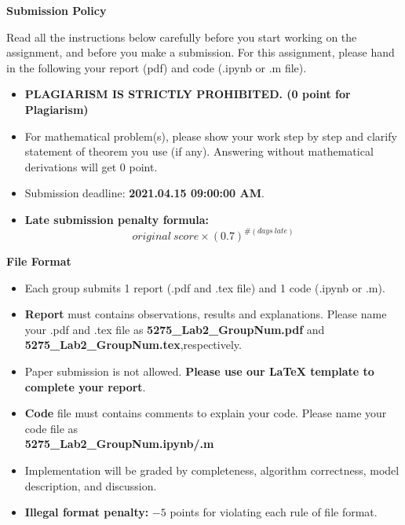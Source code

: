 \documentclass[a4 paper]{article}
\begin{document}
\noindent{\color{LightRubineRed} \rule{\linewidth}{1mm} }
\begin{center}
    \textbf{\Large{Submission Policy}}
\end{center}
\noindent{\color{LightRubineRed} \rule{\linewidth}{1mm} }
\par Read all the instructions below carefully before you start working on the assignment, and before you make a submission. For this assignment, please hand in the following your report (pdf) and code (.ipynb or .m file).
\begin{itemize}
    \item \textbf{PLAGIARISM IS STRICTLY PROHIBITED. (0 point for Plagiarism)}
    \item For mathematical problem(s), please show your work step by step and clarify statement of theorem you use (if any). Answering without mathematical derivations will get 0 point.
    \item Submission deadline: \textbf{2021.04.15 09:00:00 AM}. 
    \item \textbf{Late submission penalty formula:} $$original \ score\times(0.7)^{\#(days \ late)}$$ 
\end{itemize}
\noindent{\color{LightRubineRed} \rule{\linewidth}{0.1mm}}
\begin{center}
    \textbf{\large{File Format}}
\end{center}
\begin{itemize}
    \item Each group submits 1 report (.pdf and .tex file) and 1 code (.ipynb or .m).
    \item \textbf{Report} must contains observations, results and explanations. Please name your .pdf and .tex file as \textbf{5275\_Lab2\_GroupNum.pdf} and \textbf{5275\_Lab2\_GroupNum.tex},respectively.
    \item Paper submission is not allowed. \textbf{Please use our \LaTeX{} template to complete your report}.
    \item \textbf{Code} file must contains comments to explain your code. Please name your code file as\\ \textbf{5275\_Lab2\_GroupNum.ipynb/.m}
    \item Implementation will be graded by completeness, algorithm correctness, model description, and discussion.
    \item \textbf{Illegal format penalty:} $-5$ points for violating each rule of file format.
\end{itemize}
\end{document}
